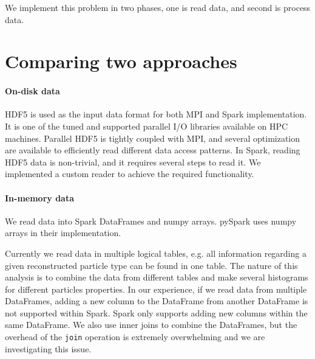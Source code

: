 \documentclass[11pt, twocolumn]{article}
\newcommand{\squeezeup}{\vspace{-5.5mm}}
\begin{document}
We implement this problem in two phases, one is read data, and second is process data. 





\section{Comparing two approaches}
 \paragraph{On-disk data} 
HDF5 is used as the input data format for both MPI and Spark implementation. 
It is one of the tuned and supported parallel I/O libraries available on HPC machines. 
Parallel HDF5 is tightly coupled with MPI, and several optimization are 
available to efficiently read different data access patterns. 
In Spark, reading HDF5 data is non-trivial, and it requires several steps 
to read it. We implemented a custom reader to achieve the required functionality. 

\paragraph{In-memory data}
We read data into Spark DataFrames and numpy arrays. 
pySpark uses numpy arrays in their implementation. 

Currently we read data in multiple logical tables, e.g. all information regarding 
a given reconstructed particle type can be found in one table. The nature of this analysis is to 
combine the data from different tables 
and make several histograms for different particles properties. 
In our experience, if we read data from multiple DataFrames, 
adding a new column to the DataFrame from another 
DataFrame is not supported within Spark. Spark only supports adding new columns within the same DataFrame. 
We also use inner joins to combine the DataFrames, but the overhead of the 
\texttt{join} operation is extremely overwhelming and we are investigating this issue. 
\end{document}
